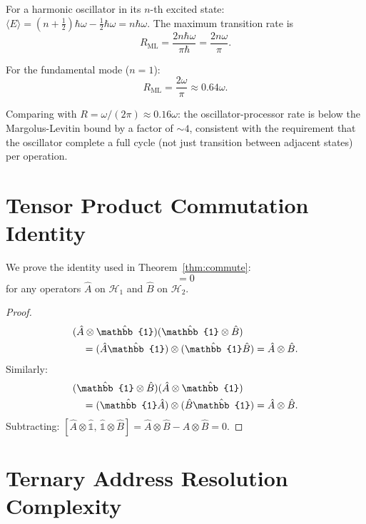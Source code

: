 \documentclass[10pt,twocolumn]{article}
\theoremstyle{definition}
\theoremstyle{remark}
\newcommand{\Hil}{\mathcal{H}}
\begin{document}
For a harmonic oscillator in its $n$-th excited state:
$\langle E\rangle = (n+\tfrac12)\hbar\omega -
\tfrac12\hbar\omega = n\hbar\omega$.  The maximum transition
rate is
\begin{equation}
  R_{\mathrm{ML}} = \frac{2n\hbar\omega}{\pi\hbar}
  = \frac{2n\omega}{\pi}.
\end{equation}

For the fundamental mode ($n=1$):
\begin{equation}
  R_{\mathrm{ML}} = \frac{2\omega}{\pi}
  \approx 0.64\omega.
\end{equation}

Comparing with $R = \omega/(2\pi)\approx 0.16\omega$: the
oscillator-processor rate is below the Margolus-Levitin bound
by a factor of $\sim 4$, consistent with the requirement that
the oscillator complete a full cycle (not just transition
between adjacent states) per operation.

\section{Tensor Product Commutation Identity}
\label{app:tensor}

We prove the identity used in Theorem~\ref{thm:commute}:
\begin{equation}
  [\hat{A}\otimes\hat{\mathbb{1}},\,
   \hat{\mathbb{1}}\otimes\hat{B}] = 0
\end{equation}
for any operators $\hat{A}$ on $\Hil_1$ and $\hat{B}$ on
$\Hil_2$.

\begin{proof}
\begin{align}
  &(\hat{A}\otimes\hat{\mathbb{1}})
   (\hat{\mathbb{1}}\otimes\hat{B})\notag\\
  &\quad= (\hat{A}\hat{\mathbb{1}})
   \otimes(\hat{\mathbb{1}}\hat{B})
  = \hat{A}\otimes\hat{B}.
\end{align}
Similarly:
\begin{align}
  &(\hat{\mathbb{1}}\otimes\hat{B})
   (\hat{A}\otimes\hat{\mathbb{1}})\notag\\
  &\quad= (\hat{\mathbb{1}}\hat{A})
   \otimes(\hat{B}\hat{\mathbb{1}})
  = \hat{A}\otimes\hat{B}.
\end{align}
Subtracting: $[\hat{A}\otimes\hat{\mathbb{1}},\,
\hat{\mathbb{1}}\otimes\hat{B}] = \hat{A}\otimes\hat{B} -
\hat{A}\otimes\hat{B} = 0$.
\end{proof}

\section{Ternary Address Resolution Complexity}
\label{app:complexity}
\end{document}
